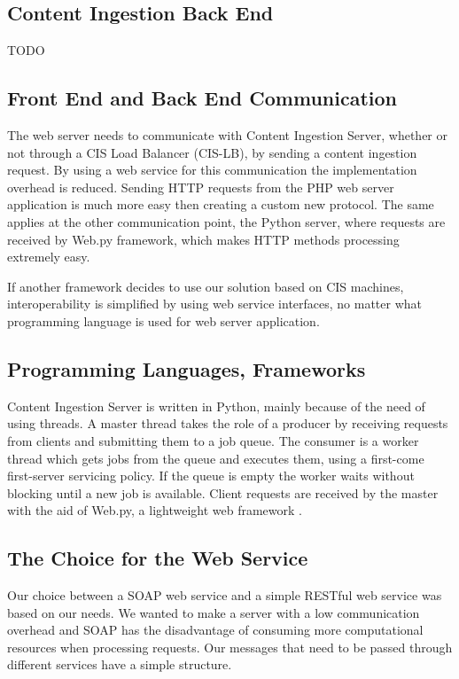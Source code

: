 \subsection{Content Ingestion Back End}
\label{subsec:back-end}

TODO

\subsection{Front End and Back End Communication}
\label{subsec:communication}

The web server needs to communicate with Content Ingestion Server, whether or not through a CIS Load Balancer (CIS-LB), by sending a content ingestion request. By using a web service for this communication the implementation overhead is reduced. Sending HTTP requests from the PHP web server application is much more easy then creating a custom new protocol. The same applies at the other communication point, the Python server, where requests are received by Web.py framework, which makes HTTP methods processing extremely easy.

If another framework decides to use our solution based on CIS machines, interoperability is simplified by using web service interfaces, no matter what programming language is used for web server application.

\subsection{Programming Languages, Frameworks}
\label{subsec:langs-and-frameworks}

Content Ingestion Server is written in Python, mainly because of the need of using threads. A master thread takes the role of a producer by receiving requests from clients and submitting them to a job queue. The consumer is a worker thread which gets jobs from the queue and executes them, using a first-come first-server servicing policy. If the queue is empty the worker waits without blocking until a new job is available. Client requests are received by the master with the aid of Web.py, a lightweight web framework \cite{webpy}.

\subsection{The Choice for the Web Service}
\label{subsec:securing-cis}

Our choice between a SOAP web service and a simple RESTful web service was based on our needs. We wanted to make a server with a low communication overhead and SOAP has the disadvantage of consuming more computational resources when processing requests. Our messages that need to be passed through different services have a simple structure. 

